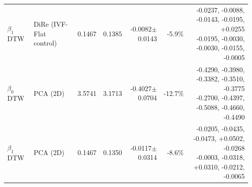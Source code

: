 \begin{tabular}{@{}llrrrrr@{}}
$\beta_1$ DTW & DiRe (IVF-Flat control) & 0.1467 & 0.1385 & -0.0082$\pm$0.0143 & -5.9\% & \shortstack[l]{-0.0237, -0.0088, -0.0143, -0.0195, +0.0255\\-0.0195, -0.0030, -0.0030, -0.0155, -0.0005} \\
$\beta_0$ DTW & PCA (2D) & 3.5741 & 3.1713 & -0.4027$\pm$0.0704 & -12.7\% & \shortstack[l]{-0.4290, -0.3980, -0.3382, -0.3510, -0.3775\\-0.2700, -0.4397, -0.5088, -0.4660, -0.4490} \\
$\beta_1$ DTW & PCA (2D) & 0.1467 & 0.1350 & -0.0117$\pm$0.0314 & -8.6\% & \shortstack[l]{-0.0205, -0.0435, -0.0473, +0.0502, -0.0268\\-0.0003, -0.0318, +0.0310, -0.0212, -0.0065} \\
\bottomrule
\end{tabular}
